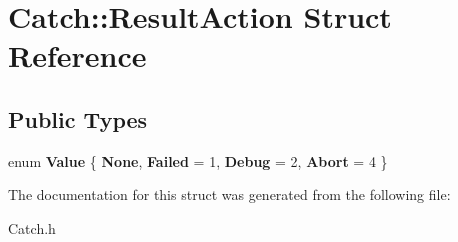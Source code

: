 \hypertarget{struct_catch_1_1_result_action}{\section{Catch\-:\-:Result\-Action Struct Reference}
\label{struct_catch_1_1_result_action}
}
\subsection*{Public Types}
\begin{DoxyCompactItemize}
\item 
enum {\bfseries Value} \{ {\bfseries None}, 
{\bfseries Failed} = 1, 
{\bfseries Debug} = 2, 
{\bfseries Abort} = 4
 \}
\end{DoxyCompactItemize}


The documentation for this struct was generated from the following file\-:\begin{DoxyCompactItemize}
\item 
Catch.\-h\end{DoxyCompactItemize}
